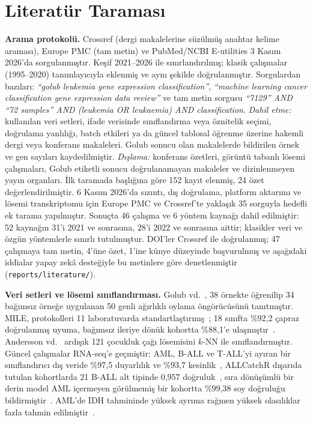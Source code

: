 \documentclass[conference]{IEEEtran}
\begin{document}
\section{Literatür Taraması}\label{sec:lit}
\textbf{Arama protokolü.} Crossref (dergi makalelerine süzülmüş anahtar kelime araması), Europe PMC
(tam metin) ve PubMed/NCBI E-utilities 3 Kasım 2026'da sorgulanmıştır. Keşif 2021--2026 ile
sınırlandırılmış; klasik çalışmalar (1995--2020) tanımlayıcıyla eklenmiş ve aynı şekilde
doğrulanmıştır. Sorgulardan bazıları: \textit{``golub leukemia gene expression classification''},
\textit{``machine learning cancer classification gene expression data review''} ve tam metin
sorgusu \textit{``7129'' AND ``72 samples'' AND (leukemia OR leukaemia) AND classification}.
\emph{Dahil etme:} kullanılan veri setleri, ifade verisinde sınıflandırma veya öznitelik seçimi,
doğrulama yanlılığı, batch etkileri ya da güncel tablosal öğrenme üzerine hakemli dergi veya
konferans makaleleri. Golub sonucu olan makalelerde bildirilen örnek ve gen sayıları kaydedilmiştir.
\emph{Dışlama:} konferans özetleri, görüntü tabanlı lösemi çalışmaları, Golub etiketli sonucu
doğrulanamayan makaleler ve dizinlenmeyen yayın organları. İlk taramada başlığına göre 152 kayıt elenmiş,
24 özet değerlendirilmiştir. 6 Kasım 2026'da sızıntı, dış doğrulama, platform aktarımı ve lösemi
transkriptomu için Europe PMC ve Crossref'te yaklaşık 35 sorguyla hedefli ek tarama yapılmıştır. Sonuçta
46 çalışma ve 6 yöntem kaynağı dahil edilmiştir: 52 kaynağın 31'i 2021 ve sonrasına, 28'i 2022 ve
sonrasına aittir; klasikler veri ve özgün yöntemlerle sınırlı tutulmuştur. DOI'ler Crossref ile
doğrulanmış; 47 çalışmaya tam metin, 4'üne özet, 1'ine künye düzeyinde başvurulmuş ve aşağıdaki
iddialar yapay zekâ desteğiyle bu metinlere göre denetlenmiştir (\texttt{reports/literature/}).

\textbf{Veri setleri ve lösemi sınıflandırması.} Golub vd.~\cite{golub1999}, 38 örnekte öğrenilip 34
bağımsız örneğe uygulanan 50 genli ağırlıklı oylama öngörücüsünü tanıtmıştır. MILE, protokolleri 11
laboratuvarda standartlaştırmış~\cite{kohlmann2008}; 18 sınıfta \%92,2 çapraz doğrulanmış uyuma,
bağımsız ileriye dönük kohortta \%88,1'e ulaşmıştır~\cite{haferlach2010}. Andersson
vd.~\cite{andersson2007} ardışık 121 çocukluk çağı lösemisini $k$-NN ile sınıflandırmıştır. Güncel
çalışmalar RNA-seq'e geçmiştir: AML, B-ALL ve T-ALL'yi ayıran bir sınıflandırıcı dış veride \%97,5
duyarlılık ve \%93,7 kesinlik~\cite{mulet2025}, ALLCatchR dışarıda tutulan kohortlarda 21 B-ALL alt
tipinde 0,957 doğruluk~\cite{beder2023}, sıra dönüşümlü bir derin model AML içermeyen görülmemiş bir
kohortta \%99,38 soy doğruluğu bildirmiştir~\cite{cui2026}. AML'de IDH tahmininde yüksek ayrıma
rağmen yüksek olasılıklar fazla tahmin edilmiştir~\cite{jung2026}.
\end{document}
